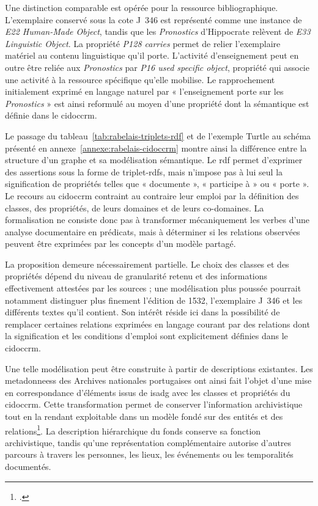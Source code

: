 Une distinction comparable est opérée pour la ressource bibliographique. L'exemplaire conservé sous la cote J~346 est représenté comme une instance de \emph{E22 Human-Made Object}, tandis que les \emph{Pronostics} d'Hippocrate relèvent de \emph{E33 Linguistic Object}. La propriété \emph{P128 carries} permet de relier l'exemplaire matériel au contenu linguistique qu'il porte. L'activité d'enseignement peut en outre être reliée aux \emph{Pronostics} par \emph{P16 used specific object}, propriété qui associe une activité à la ressource spécifique qu'elle mobilise. Le rapprochement initialement exprimé en langage naturel par « l'enseignement porte sur les \emph{Pronostics} » est ainsi reformulé au moyen d'une propriété dont la sémantique est définie dans le \gls{cidoccrm}.

Le passage du tableau~\ref{tab:rabelais-triplets-rdf} et de l'exemple Turtle au schéma présenté en annexe~\ref{annexe:rabelais-cidoccrm} montre ainsi la différence entre la structure d'un graphe et sa modélisation sémantique. Le \gls{rdf} permet d'exprimer des assertions sous la forme de \glspl{triplet-rdf}, mais n'impose pas à lui seul la signification de propriétés telles que « documente », « participe à » ou « porte ». Le recours au \gls{cidoccrm} contraint au contraire leur emploi par la définition des classes, des propriétés, de leurs domaines et de leurs co-domaines. La formalisation ne consiste donc pas à transformer mécaniquement les verbes d'une analyse documentaire en prédicats, mais à déterminer si les relations observées peuvent être exprimées par les concepts d'un modèle partagé.

La proposition demeure nécessairement partielle. Le choix des classes et des propriétés dépend du niveau de granularité retenu et des informations effectivement attestées par les sources ; une modélisation plus poussée pourrait notamment distinguer plus finement l'édition de 1532, l'exemplaire J~346 et les différents textes qu'il contient. Son intérêt réside ici dans la possibilité de remplacer certaines relations exprimées en langage courant par des relations dont la signification et les conditions d'emploi sont explicitement définies dans le \gls{cidoccrm}.

Une telle modélisation peut être construite à partir de descriptions existantes. Les \glspl{metadonnees} des Archives nationales portugaises ont ainsi fait l'objet d'une mise en correspondance d'éléments issus de \gls{isadg} avec les classes et propriétés du \gls{cidoccrm}. Cette transformation permet de conserver l'information archivistique tout en la rendant exploitable dans un modèle fondé sur des entités et des relations\footcite{MeloRodriguesVaragnolo2023}. La description hiérarchique du fonds conserve sa fonction archivistique, tandis qu'une représentation complémentaire autorise d'autres parcours à travers les personnes, les lieux, les événements ou les temporalités documentés.

